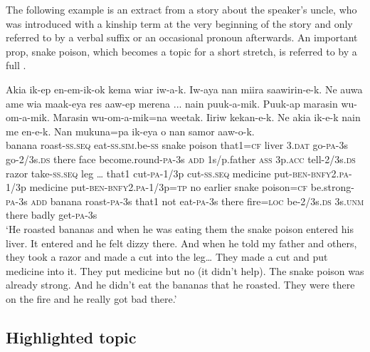 The following example is an extract from a story about the speaker's uncle, who was introduced with a kinship term at the very beginning of the story and only referred to by a verbal suffix or an occasional pronoun afterwards. An  important prop, snake poison, which becomes a topic for a short stretch, is referred to by a full .

\ea%
\label{ex:x1677}
\gll Akia  ik-ep  en-em-ik-ok      kema  wiar  iw-a-k. Iw-aya  nan  miira  saawirin-e-k. Ne  auwa  ame  wia  maak-eya  res  aaw-ep merena  ...  nain  puuk-a-mik.  Puuk-ap  marasin wu-om-a-mik.  Marasin  wu-om-a-mik=na weetak.  Iiriw     kekan-e-k. Ne  akia  ik-e-k  nain  me  en-e-k.  Nan mukuna=pa  ik-eya o  nan  samor  aaw-o-k.\\
banana  roast-\textsc{ss}.\textsc{seq}  eat-\textsc{ss}.\textsc{sim}.be-\textsc{ss}  snake  poison that1=\textsc{cf}  liver  3.\textsc{dat}  go-\textsc{pa}-3s go-2/3s.\textsc{ds}  there  face  become.round-\textsc{pa}-3s \textsc{add}  1s/p.father  \textsc{ass}  3p.\textsc{acc}  tell-2/3s.\textsc{ds}  razor  take-\textsc{ss}.\textsc{seq} leg  {\dots}  that1  cut-\textsc{pa}-1/3p  cut-\textsc{ss}.\textsc{seq}  medicine put-\textsc{ben}-\textsc{bnfy}2.\textsc{pa}-1/3p  medicine  put-\textsc{ben}-\textsc{bnfy}2.\textsc{pa}-1/3p=\textsc{tp} no  earlier  snake  poison=\textsc{cf}  be.strong-\textsc{pa}-3s \textsc{add}  banana  roast-\textsc{pa}-3s  that1  not  eat-\textsc{pa}-3s  there fire=\textsc{loc}  be-2/3s.\textsc{ds}  3s.\textsc{unm}  there  badly  get-\textsc{pa}-3s\\
\glt`He roasted bananas and when he was eating them the snake poison entered his liver. It entered and he felt dizzy there. And when he told my father and others, they took a razor and made a cut into the leg{\dots} They made a cut and put medicine into it. They put medicine but no (it didn't help). The snake poison was already strong. And he didn't eat the bananas that he roasted. They were there on the fire and he really got bad there.'
\z


\subsection{Highlighted topic}


